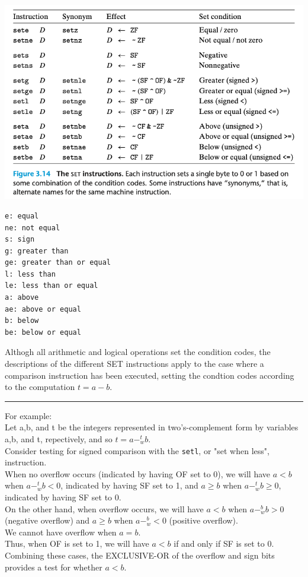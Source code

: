 \documentclass[11pt]{article}
\begin{document}
\begin{center}
\includegraphics[width=.9\linewidth]{pics/the-set-instructions.png}
\end{center}


\begin{verbatim}
e: equal
ne: not equal
s: sign
g: greater than
ge: greater than or equal
l: less than
le: less than or equal
a: above
ae: above or equal
b: below
be: below or equal
\end{verbatim}

Althogh all arithmetic and logical operations set the condition codes, the descriptions of the different SET instructions apply to the case where a comparison instruction has been executed, setting the condtion codes according to the computation \(t = a-b\).\\

\noindent\rule{\textwidth}{0.5pt}
For example:\\
Let a,b, and t be the integers represented in two's-complement form by variables a,b, and t, repectively, and so \(t = a -_w^t b\).\\
Consider testing for signed comparison with the \texttt{setl}, or "set when less", instruction.\\
When no overflow occurs (indicated by having OF set to 0), we will have \(a < b\) when \(a -_w^t b < 0\), indicated by having SF set to 1, and \(a \ge b\) when \(a -_w^t b \ge 0\), indicated by having SF set to 0.\\
On the other hand, when overflow occurs, we will have \(a < b\) when \(a -_w^b b > 0\) (negative overflow) and \(a \ge b\) when \(a -_w^b < 0\) (positive overflow).\\
We cannot have overflow when \(a = b\).\\
Thus, when OF is set to 1, we will have \(a<b\) if and only if SF is set to 0.\\
Combining these cases, the EXCLUSIVE-OR of the overflow and sign bits provides a test for whether \(a<b\).\\
\end{document}
